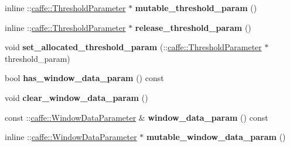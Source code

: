 \begin{DoxyCompactItemize}
\item 
\mbox{\label{classcaffe_1_1_v1_layer_parameter_a4ccc209e3dcc92f960b6fabcbdaabf1b}} 
inline \+::\mbox{\hyperlink{classcaffe_1_1_threshold_parameter}{caffe\+::\+Threshold\+Parameter}} $\ast$ {\bfseries mutable\+\_\+threshold\+\_\+param} ()
\item 
\mbox{\label{classcaffe_1_1_v1_layer_parameter_a99ee3a24982da4a34da0114025e3f514}} 
inline \+::\mbox{\hyperlink{classcaffe_1_1_threshold_parameter}{caffe\+::\+Threshold\+Parameter}} $\ast$ {\bfseries release\+\_\+threshold\+\_\+param} ()
\item 
\mbox{\label{classcaffe_1_1_v1_layer_parameter_a15ccf36cfee9eaf1b8546d9e78074434}} 
void {\bfseries set\+\_\+allocated\+\_\+threshold\+\_\+param} (\+::\mbox{\hyperlink{classcaffe_1_1_threshold_parameter}{caffe\+::\+Threshold\+Parameter}} $\ast$threshold\+\_\+param)
\item 
\mbox{\label{classcaffe_1_1_v1_layer_parameter_a1f1b3c6c96761d3bdefb3fdde4ad9948}} 
bool {\bfseries has\+\_\+window\+\_\+data\+\_\+param} () const
\item 
\mbox{\label{classcaffe_1_1_v1_layer_parameter_a360d10265f2503734338d2b86f3bf833}} 
void {\bfseries clear\+\_\+window\+\_\+data\+\_\+param} ()
\item 
\mbox{\label{classcaffe_1_1_v1_layer_parameter_aecaa8019c3044d1448819c47d4ab7d4c}} 
const \+::\mbox{\hyperlink{classcaffe_1_1_window_data_parameter}{caffe\+::\+Window\+Data\+Parameter}} \& {\bfseries window\+\_\+data\+\_\+param} () const
\item 
\mbox{\label{classcaffe_1_1_v1_layer_parameter_a9f0e59225cfd91db684d908bde403b90}} 
inline \+::\mbox{\hyperlink{classcaffe_1_1_window_data_parameter}{caffe\+::\+Window\+Data\+Parameter}} $\ast$ {\bfseries mutable\+\_\+window\+\_\+data\+\_\+param} ()
\item 
\mbox{\label{classcaffe_1_1_v1_layer_parameter_a81a68bc84ea4694544dc8dd7c98b39aa}} 

\end{DoxyCompactItemize}

